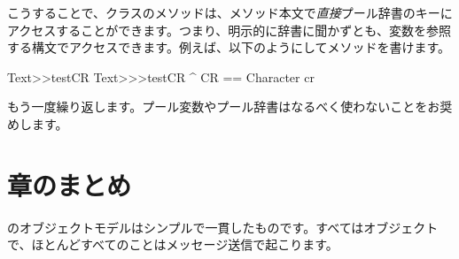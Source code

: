 \documentclass[a4paper,10pt,twoside]{book}
\begin{document}
こうすることで、クラスのメソッドは、メソッド本文で\emph{直接}プール辞書のキーにアクセスすることができます。つまり、明示的に辞書に聞かずとも、変数を参照する構文でアクセスできます。例えば、以下のようにしてメソッドを書けます。
  
\begin{method}[texttestcr]{Text>>testCR}
Text>>>testCR 	
      ^ CR == Character cr
\end{method}

もう一度繰り返します。プール変数やプール辞書はなるべく使わないことをお奨めします。

\section{章のまとめ}

\pharo のオブジェクトモデルはシンプルで一貫したものです。すべてはオブジェクトで、ほとんどすべてのことはメッセージ送信で起こります。
\end{document}
